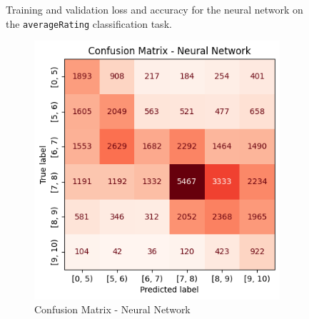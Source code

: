 \begin{figure}[H]
\begin{subfigure}[b]{0.48\textwidth}
        \label{fig:accuracy_nn_rating}
    \end{subfigure}
    \caption{Training and validation loss and accuracy for the neural network on the \texttt{averageRating} classification task.}
    \label{fig:nn_performance_rating}
\end{figure}

\begin{figure}[H]
    \centering
    \begin{subfigure}[b]{0.45\textwidth}
        \centering
        \includegraphics[width=\textwidth]{plotsss/cm_nn_rating.png}
        \caption{Confusion Matrix - Neural Network}
        \label{fig:cm_nn_rating}
    \end{subfigure}
    \hfill
    \begin{subfigure}[b]{0.53\textwidth}
        \centering

\end{subfigure}
\end{figure}
